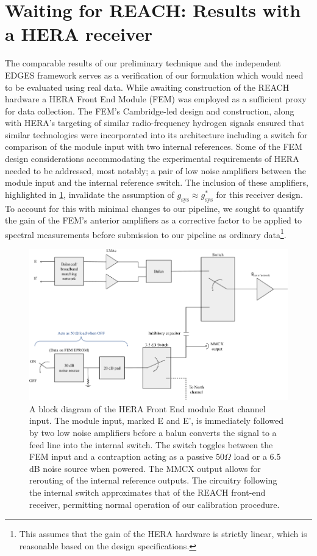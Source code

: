 \section{Waiting for REACH: Results with a HERA receiver}\label{sec:hera_results}
The comparable results of our preliminary technique and the independent EDGES framework serves as a verification of our formulation which would need to be evaluated using real data. While awaiting construction of the REACH hardware a HERA Front End Module (FEM) was employed as a sufficient proxy for data collection. The FEM’s Cambridge-led design and construction, along with HERA’s targeting of similar radio-frequency hydrogen signals ensured that similar technologies were incorporated into its architecture including a switch for comparison of the module input with two internal references. Some of the FEM design considerations accommodating the experimental requirements of HERA needed to be addressed, most notably; a pair of low noise amplifiers between the module input and the internal reference switch. The inclusion of these amplifiers, highlighted in \cref{fig:fem_block}, invalidate the assumption of $g_{\mathrm{sys}} \approx g_{\mathrm{sys}}^*$ for this receiver design. To account for this with minimal changes to our pipeline, we sought to quantify the gain of the FEM’s anterior amplifiers as a corrective factor to be applied to spectral measurements before submission to our pipeline as ordinary data\footnote{This assumes that the gain of the HERA hardware is strictly linear, which is reasonable based on the design specifications.}.
\begin{figure}
    \centering
    \includegraphics[width=.8\textwidth]{fem_block}
    \caption{A block diagram of the HERA Front End module East channel input. The module input, marked E and E', is immediately followed by two low noise amplifiers before a balun converts the signal to a feed line into the internal switch. The switch toggles between the FEM input and a contraption acting as a passive $50 \Omega$ load or a 6.5 dB noise source when powered. The MMCX output allows for rerouting of the internal reference outputs. The circuitry following the internal switch approximates that of the REACH front-end receiver, permitting normal operation of our calibration procedure.}
    \label{fig:fem_block}
\end{figure}

